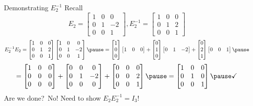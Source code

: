 \documentclass[xcoler=dvipsnames, aspectratio=169]{beamer}
\begin{document}
    \begin{frame}{Demonstrating $E^{-1}_2$}
        Recall
        \[
            E_2 = \begin{bmatrix}1&0&0\\0&1&-2\\0&0&1\end{bmatrix}, 
            E^{-1}_2 = \begin{bmatrix}1&0&0\\0&1&2\\0&0&1\end{bmatrix}
        \]
        \pause
        \[
            E^{-1}_2E_2 = \begin{bmatrix}1&0&0\\0&1&2\\0&0&1\end{bmatrix}\begin{bmatrix}1&0&0\\0&1&-2\\0&0&1\end{bmatrix} 
                \pause = \begin{bmatrix}1\\0\\0\end{bmatrix}\begin{bmatrix}1&0&0\end{bmatrix} + \begin{bmatrix}0\\1\\0\end{bmatrix}
                    \begin{bmatrix}0&1&-2\end{bmatrix} + \begin{bmatrix}0\\2\\1\end{bmatrix}\begin{bmatrix}0&0&1\end{bmatrix}\pause
        \]
        \[
            =\begin{bmatrix}1&0&0\\0&0&0\\0&0&0\end{bmatrix} + \begin{bmatrix}0&0&0\\0&1&-2\\0&0&0\end{bmatrix}
                + \begin{bmatrix}0&0&0\\0&0&2\\0&0&1\end{bmatrix}\pause = \begin{bmatrix}1&0&0\\0&1&0\\0&0&1\end{bmatrix}
                    \pause\checkmark
        \]
        Are we done?\pause\ No! Need to show $E_2E_2^{-1}=I_3$!
    \end{frame}
\end{document}
